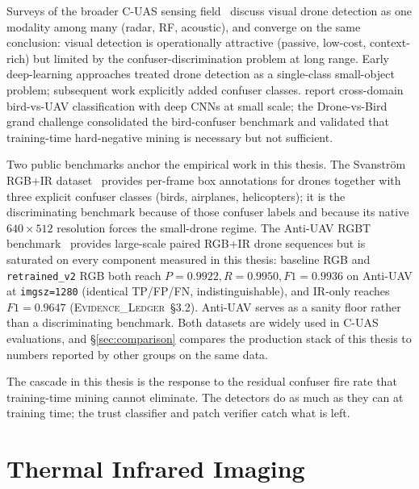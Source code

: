 \documentclass[12pt,a4paper,oneside,openright]{book}
\begin{document}
Surveys of the broader C-UAS sensing field~\cite{shi2018counteruas,taha2019drone,samaras2019deep} discuss visual drone detection as one modality among many (radar, RF, acoustic), and converge on the same conclusion: visual detection is operationally attractive (passive, low-cost, context-rich) but limited by the confuser-discrimination problem at long range. Early deep-learning approaches \cite{aker2017using,rozantsev2017detecting} treated drone detection as a single-class small-object problem; subsequent work explicitly added confuser classes. \citet{schumann2017deep} report cross-domain bird-vs-UAV classification with deep CNNs at small scale; the Drone-vs-Bird grand challenge \cite{coluccia2021dronevsbird} consolidated the bird-confuser benchmark and validated that training-time hard-negative mining is necessary but not sufficient.

Two public benchmarks anchor the empirical work in this thesis. The Svanstr\"om RGB+IR dataset~\cite{svanstrom2021real,svanstrom2022dronedataset} provides per-frame box annotations for drones together with three explicit confuser classes (birds, airplanes, helicopters); it is the discriminating benchmark because of those confuser labels and because its native $640\times512$ resolution forces the small-drone regime. The Anti-UAV RGBT benchmark~\cite{jiang2021antiuav,zhao2023antiuav} provides large-scale paired RGB+IR drone sequences but is saturated on every component measured in this thesis: baseline RGB and \texttt{retrained\_v2} RGB both reach $P=0.9922, R=0.9950, F1=0.9936$ on Anti-UAV at \texttt{imgsz=1280} (identical TP/FP/FN, indistinguishable), and IR-only reaches $F1=0.9647$ (\textsc{Evidence\_Ledger}~\S3.2). Anti-UAV serves as a sanity floor rather than a discriminating benchmark. Both datasets are widely used in C-UAS evaluations, and \S\ref{sec:comparison} compares the production stack of this thesis to numbers reported by other groups on the same data.

The cascade in this thesis is the response to the residual confuser fire rate that training-time mining cannot eliminate. The detectors do as much as they can at training time; the trust classifier and patch verifier catch what is left.

\section{Thermal Infrared Imaging}
\label{sec:lit_ir}
\end{document}
